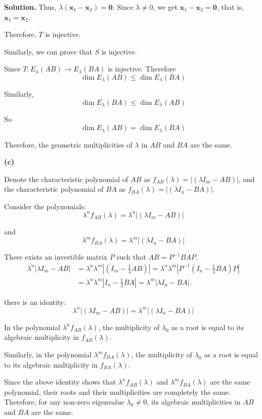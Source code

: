 \documentclass[12pt, a4paper, oneside]{ctexart}
\newenvironment{solution}{\par\noindent\textbf{Solution. }}{\par}
\begin{document}
\begin{solution}
Thus, $ \lambda(\mathbf{x}_1 - \mathbf{x}_2)=\mathbf{0} $. Since $ \lambda\neq 0 $, we get $ \mathbf{x}_1 - \mathbf{x}_2=\mathbf{0} $, that is, $ \mathbf{x}_1 = \mathbf{x}_2 $.

Therefore, $ T $ is injective.

Similarly, we can prove that $ S $ is injective.

Since $ T: E_{\lambda}(AB)\to E_{\lambda}(BA) $ is injective. Therefore
$$
\dim E_{\lambda}(AB)\leq\dim E_{\lambda}(BA)
$$

Similarly,
$$
\dim E_{\lambda}(BA)\leq\dim E_{\lambda}(AB)
$$

So
$$
\dim E_{\lambda}(AB)=\dim E_{\lambda}(BA)
$$

Therefore, the geometric multiplicities of $ \lambda $ in $ AB $ and $ BA $ are the same.

\vspace{12pt}

\textbf{(c)}

Denote the characteristic polynomial of $ AB $ as $ f_{AB}(\lambda)=\vert (\lambda I_m - AB)\vert $, and the characteristic polynomial of $ BA $ as $ f_{BA}(\lambda)=\vert(\lambda I_n - BA) \vert $.

Consider the polynomials:
$$
\lambda^n f_{AB}(\lambda) = \lambda^n \vert(\lambda I_m - AB)\vert
$$

and
$$
\lambda^m f_{BA}(\lambda) = \lambda^m \vert(\lambda I_n - BA)\vert
$$

There exists an invertible matrix $P$ such that $AB = P^{-1}BAP$.
\begin{align*}
	\lambda^n \vert \lambda I_m - AB \vert &= \lambda^n \lambda^m \left\vert  \left( I_m - \frac{1}{\lambda}AB \right) \right\vert = \lambda^n \lambda^m \left\vert P^{-1}(I_n -  \frac{1}{\lambda}BA)P \right\vert \\
	&= \lambda^n \lambda^m \left\vert I_n - \frac{1}{\lambda}BA  \right\vert = \lambda^m \vert \lambda I_n - BA \vert.
\end{align*}

there is an identity:
$$
\lambda^n \vert(\lambda I_m - AB)\vert = \lambda^m \vert(\lambda I_n - BA)\vert
$$

In the polynomial $ \lambda^n f_{AB}(\lambda) $, the multiplicity of $ \lambda_0 $ as a root is equal to its algebraic multiplicity in $ f_{AB}(\lambda) $. 

Similarly, in the polynomial $ \lambda^m f_{BA}(\lambda) $, the multiplicity of $ \lambda_0 $ as a root is equal to its algebraic multiplicity in $ f_{BA}(\lambda) $.

Since the above identity shows that $ \lambda^n f_{AB}(\lambda) $ and $ \lambda^m f_{BA}(\lambda) $ are the same polynomial, their roots and their multiplicities are completely the same. Therefore, for any non-zero eigenvalue $ \lambda_0 \neq 0 $, its algebraic multiplicities in $ AB $ and $ BA $ are the same.

\end{solution}
\end{document}
